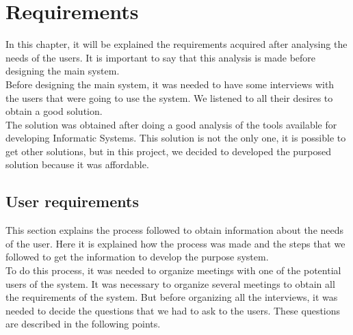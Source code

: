 
\chapter{Requirements}

In this chapter, it will be explained the requirements acquired after analysing the needs of the users. It is important to say that this analysis is made before designing the main system.\\

Before designing the main system, it was needed to have some interviews with the users that were going to use the system. We listened to all their desires to obtain a good solution.\\

The solution was obtained after doing a good analysis of the tools available for developing Informatic Systems. This solution is not the only one, it is possible to get other solutions, but in this project, we decided to developed the purposed solution because it was affordable.

\section{User requirements}

This section explains the process followed to obtain information about the needs of the user. Here it is explained how the process was made and the steps that we followed to get the information to develop the purpose system.\\

To do this process, it was needed to organize meetings with one of the potential users of the system. It was necessary to organize several meetings to obtain all the requirements of the system. But before organizing all the interviews, it was needed to decide the questions that we had to ask to the users. These questions are described in the following points.

